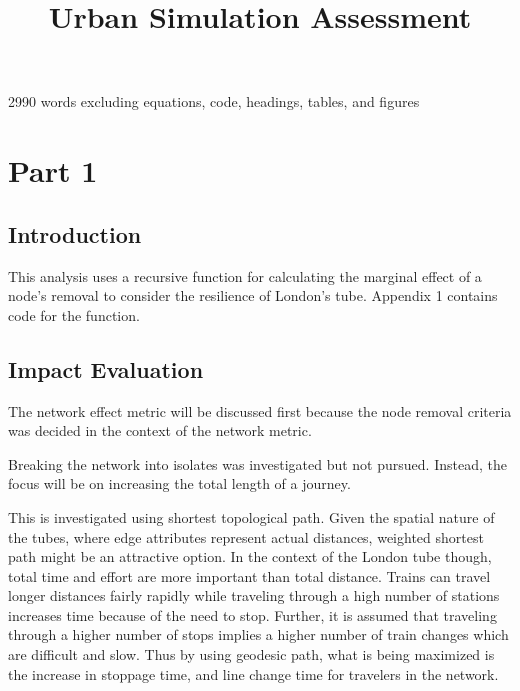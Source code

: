 \documentclass[11pt]{article} %
\title{\vspace{-3.0cm}Urban Simulation Assessment}
\begin{document}
\maketitle


2990 words excluding equations, code, headings, tables, and figures



\section{Part 1}



\subsection{Introduction}

This analysis uses a recursive function for calculating the marginal effect of a node's removal to consider the resilience of London's tube. Appendix 1 contains code for the function.


\subsection{Impact Evaluation}
The network effect metric will be discussed first because the node removal criteria was decided in the context of the network metric.

Breaking the network into isolates was investigated but not pursued. Instead, the focus will be on increasing the total length of a journey. 

This is investigated using shortest topological path. Given the spatial nature of the tubes, where edge attributes represent actual distances, weighted shortest path might be an attractive option. In the context of the London tube though, total time and effort are more important than total distance. Trains can travel longer distances fairly rapidly while traveling through a high number of stations increases time because of the need to stop. Further, it is assumed that traveling through a higher number of stops implies a higher number of train changes which are difficult and slow. Thus by using geodesic path, what is being maximized is the increase in stoppage time, and line change time for travelers in the network.
\end{document}
